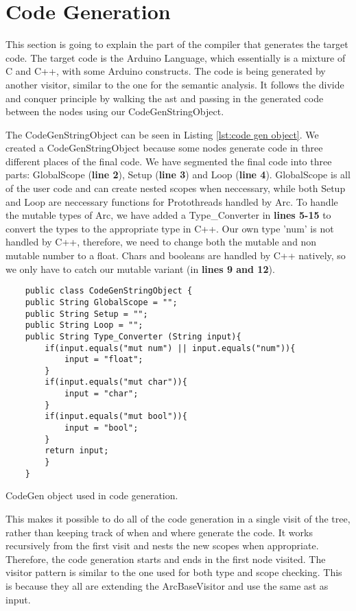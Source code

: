 \section{Code Generation}\label{sec:codegeneration}

This section is going to explain the part of the compiler that generates the target code. The target code is the Arduino Language, which essentially is a mixture of C and C++, with some Arduino constructs. The code is being generated by another visitor, similar to the one for the semantic analysis. It follows the divide and conquer principle by walking the \gls{ast} and passing in the generated code between the nodes using our CodeGenStringObject.

The CodeGenStringObject can be seen in Listing \ref{lst:code gen object}. We created a CodeGenStringObject because some nodes generate code in three different places of the final code. We have segmented the final code into three parts: GlobalScope (\textbf{line 2}), Setup (\textbf{line 3}) and Loop (\textbf{line 4}). GlobalScope is all of the user code and can create nested scopes when neccessary, while both Setup and Loop are neccessary functions for Protothreads handled by Arc. To handle the mutable types of Arc, we have added a Type\_Converter in \textbf{lines 5-15} to convert the types to the appropriate type in C++. Our own type 'num' is not handled by C++, therefore, we need to change both the mutable and non mutable number to a float. Chars and booleans are handled by C++ natively, so we only have to catch our mutable variant (in \textbf{lines 9 and 12}).

\begin{listing}[htb!]
    \begin{verbatim}
    public class CodeGenStringObject {
    public String GlobalScope = "";
    public String Setup = "";
    public String Loop = "";
    public String Type_Converter (String input){
        if(input.equals("mut num") || input.equals("num")){
            input = "float";
        }
        if(input.equals("mut char")){
            input = "char";
        }
        if(input.equals("mut bool")){
            input = "bool";
        }
        return input;
        }
    }
    \end{verbatim}
    \caption{CodeGen object used in code generation.}
    \label{lst:code gen object}
\end{listing}

This makes it possible to do all of the code generation in a single visit of the tree, rather than keeping track of when and where generate the code. It works recursively from the first visit and nests the new scopes when appropriate. Therefore, the code generation starts and ends in the first node visited. The visitor pattern is similar to the one used for both type and scope checking. This is because they all are extending the ArcBaseVisitor and use the same \gls{ast} as input.

